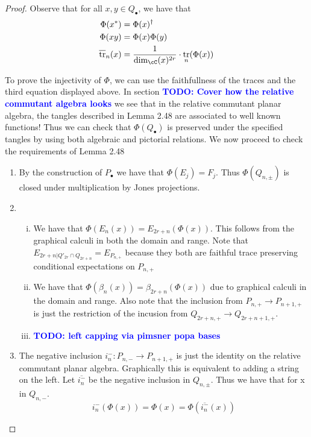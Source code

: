 \documentclass[11pt]{article}
\theoremstyle{plain}
\theoremstyle{definition}
\DeclareMathOperator{\tr}{tr}
\newcommand{\todo}[1]{\textcolor{blue}{\textbf{TODO: #1}}}
\begin{document}
\begin{proof}
Observe that for all $x,y \in Q_{\bullet}$, we have that 
\begin{align*}
	\Phi(x^{*}) &= \Phi(x)^{\dagger} \\
	\Phi(xy) &= \Phi(x)\Phi(y) \\
	\overline{\tr}_{n}(x) &= \frac{1}{\dim_\cC(x)^{2r}}\cdot\tr_{n}(\Phi(x)) 
\end{align*}

To prove the injectivity of $\Phi$, we can use the faithfullness of the traces and the third equation displayed above. In section \todo{Cover how the relative commutant algebra looks} we see that in the relative commutant planar algebra, the tangles described in Lemma 2.48 are associated to well known functions! Thus we can check that $\Phi(Q_\bullet)$ is preserved under the specified tangles by using both algebraic and pictorial relations. We now proceed to check the requirements of Lemma 2.48  
\begin{enumerate}[(1)]
\item By the construction of $P_{\bullet}$ we have that $\Phi(E_j)=F_j$. Thus $\Phi(Q_{n,\pm})$ is closed under multiplication by Jones projections. 
\item \begin{enumerate}[(i)]
\item We have that $\Phi(E_n(x)) = E_{2r+n}(\Phi(x))$. This follows from the graphical calculi in both the domain and range. Note that $E_{2r+n | Q'_{2r}\cap Q_{2r+n}} = E_{P_{n,+}}$ because they both are faithful trace preserving conditional expectations on $P_{n,+}$
\item We have that $\Phi(\beta_n(x)) = \beta_{2r+n}(\Phi(x))$ due to graphical calculi in the domain and range. Also note that the inclusion from $P_{n,+} \to P_{n+1,+}$ is just the restriction of the incusion from $Q_{2r+n,+} \to Q_{2r+n+1,+}$. 
\item \todo{left capping via pimsner popa bases} 
\end{enumerate}
\item The negative inclusion $i^{-}_{n} : P_{n,-} \to P_{n+1,+}$ is just the identity on the relative commutant planar algebra. Graphically this is equivalent to adding a string on the left. Let $\overline{i^{-}_{n}}$ be the negative inclusion in $Q_{n,\pm}$. Thus we have that for x in $Q_{n,-}$.
\[ i^{-}_{n}(\Phi(x)) = \Phi(x) = \Phi(\overline{i^{-}_{n}}(x)) \]
\end{enumerate}
\end{proof}
\end{document}
